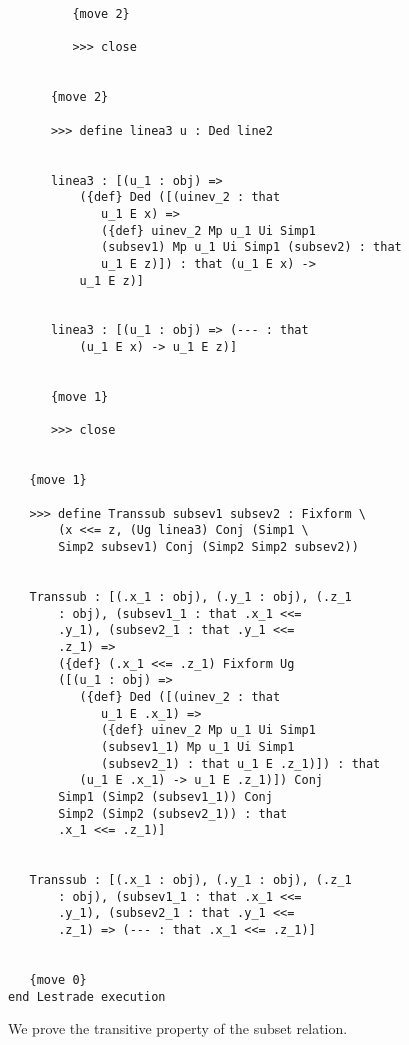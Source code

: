 \documentclass[12pt]{article}
\begin{document}
\begin{verbatim}
         {move 2}

         >>> close


      {move 2}

      >>> define linea3 u : Ded line2


      linea3 : [(u_1 : obj) => 
          ({def} Ded ([(uinev_2 : that 
             u_1 E x) => 
             ({def} uinev_2 Mp u_1 Ui Simp1 
             (subsev1) Mp u_1 Ui Simp1 (subsev2) : that 
             u_1 E z)]) : that (u_1 E x) -> 
          u_1 E z)]


      linea3 : [(u_1 : obj) => (--- : that 
          (u_1 E x) -> u_1 E z)]


      {move 1}

      >>> close


   {move 1}

   >>> define Transsub subsev1 subsev2 : Fixform \
       (x <<= z, (Ug linea3) Conj (Simp1 \
       Simp2 subsev1) Conj (Simp2 Simp2 subsev2))


   Transsub : [(.x_1 : obj), (.y_1 : obj), (.z_1 
       : obj), (subsev1_1 : that .x_1 <<= 
       .y_1), (subsev2_1 : that .y_1 <<= 
       .z_1) => 
       ({def} (.x_1 <<= .z_1) Fixform Ug 
       ([(u_1 : obj) => 
          ({def} Ded ([(uinev_2 : that 
             u_1 E .x_1) => 
             ({def} uinev_2 Mp u_1 Ui Simp1 
             (subsev1_1) Mp u_1 Ui Simp1 
             (subsev2_1) : that u_1 E .z_1)]) : that 
          (u_1 E .x_1) -> u_1 E .z_1)]) Conj 
       Simp1 (Simp2 (subsev1_1)) Conj 
       Simp2 (Simp2 (subsev2_1)) : that 
       .x_1 <<= .z_1)]


   Transsub : [(.x_1 : obj), (.y_1 : obj), (.z_1 
       : obj), (subsev1_1 : that .x_1 <<= 
       .y_1), (subsev2_1 : that .y_1 <<= 
       .z_1) => (--- : that .x_1 <<= .z_1)]


   {move 0}
end Lestrade execution
\end{verbatim}

We prove the transitive property of the subset relation.
\end{document}
